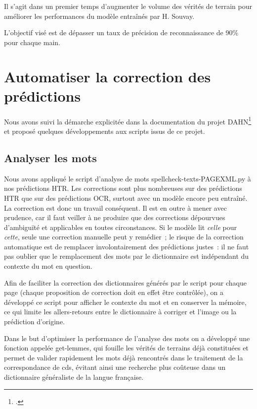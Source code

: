 \documentclass[a4paper,12pt,twoside]{book}
\begin{document}
			Il s'agit dans un premier temps d'augmenter le volume des vérités de terrain pour améliorer les performances du modèle entraînés par H. Souvay.
			
			L'objectif visé est de dépasser un taux de précision de reconnaissance de 90\% pour chaque main.
	
		\section{Automatiser la correction des prédictions}
			Nous avons suivi la démarche explicitée dans la documentation du projet DAHN\footcite{chiffoleauHowPostOCRCorrection2022} et proposé quelques développements aux scripts issus de ce projet.
					
			\subsection{Analyser les mots}
				Nous avons appliqué le script d'analyse de mots \textsf{spellcheck-texts-PAGEXML.py} à nos prédictions HTR. Les corrections sont plus nombreuses sur des prédictions HTR que sur des prédictions OCR, surtout avec un modèle encore peu entraîné. La correction est donc un travail conséquent. Il est en outre à mener avec prudence, car il faut veiller à ne produire que des corrections dépourvues d'ambiguïté et applicables en toutes circonstances. Si le modèle lit \textit{celle} pour \textit{cette}, seule une correction manuelle peut y remédier~; le risque de la correction automatique est de remplacer involontairement des prédictions justes~: il ne faut pas oublier que le remplacement des mots par le dictionnaire est indépendant du contexte du mot en question.
				
				Afin de faciliter la correction des dictionnaires générés par le script pour chaque page (chaque proposition de correction doit en effet être contrôlée), on a développé ce script pour afficher le contexte du mot et en conserver la mémoire, ce qui limite les allers-retours entre le dictionnaire à corriger et l'image ou la prédiction d'origine.
				
				Dans le but d'optimiser la performance de l'analyse des mots on a développé une fonction appelée \textsf{get-lemmes}, qui fouille les vérités de terrains déjà constituées et permet de valider rapidement les mots déjà rencontrés dans le traitement de la correspondance de \gls{cds}, évitant ainsi une recherche plus coûteuse dans un dictionnaire généraliste de la langue française.
				
\end{document}
